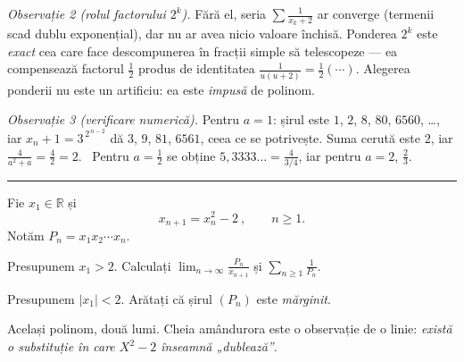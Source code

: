\emph{Observație 2 (rolul factorului $2^{k}$).} Fără el, seria $\sum\frac{1}{x_{k}+2}$ ar converge (termenii scad dublu exponențial), dar nu ar avea nicio valoare închisă. Ponderea $2^{k}$ este \emph{exact} cea care face descompunerea în fracții simple să telescopeze --- ea compensează factorul $\frac12$ produs de identitatea $\frac{1}{u(u+2)}=\frac12(\cdots)$. Alegerea ponderii nu este un artificiu: ea este \emph{impusă} de polinom.

\emph{Observație 3 (verificare numerică).} Pentru $a=1$: șirul este $1$, $2$, $8$, $80$, $6560$, \dots, iar $x_{n}+1=3^{\,2^{\,n-2}}$ dă $3$, $9$, $81$, $6561$, ceea ce se potrivește. Suma cerută este $2$, iar $\frac{4}{a^{2}+a}=\frac42=2$. \checkmark\ Pentru $a=\frac12$ se obține $5{,}3333\ldots=\frac{4}{3/4}$, iar pentru $a=2$, $\frac23$.
\vspace{1mm}\hrule

Fie $x_{1}\in\mathbb{R}$ și
\[ x_{n+1}=x_{n}^{2}-2\ ,\qquad n\ge1 . \]
Notăm $P_{n}=x_{1}x_{2}\cdots x_{n}$.
\begin{parti}
  \item Presupunem $x_{1}>2$. Calculați $\displaystyle\lim_{n\to\infty}\frac{P_{n}}{x_{n+1}}$ și $\displaystyle\sum_{n\ge1}\frac{1}{P_{n}}$.
  \item Presupunem $|x_{1}|<2$. Arătați că șirul $(P_{n})$ este \emph{mărginit}.
\end{parti}
\sol Același polinom, două lumi. Cheia amândurora este o observație de o linie: \emph{există o substituție în care $X^{2}-2$ înseamnă „dublează''}.

